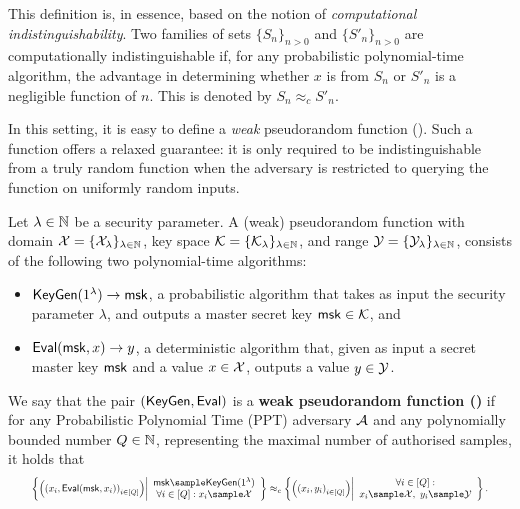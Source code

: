 This definition is, in essence, based on the notion of \emph{computational indistinguishability}. Two families of sets $\{S_n\}_{n > 0}$ and $\{S'_n\}_{n > 0}$ are computationally indistinguishable if, for any probabilistic polynomial-time algorithm, the advantage in determining whether $x$ is from $S_n$ or $S'_n$ is a negligible function of $n$. This is denoted by $S_n \approx_c S'_n$.

In this setting, it is easy to define a \emph{weak} pseudorandom function (\wPRF). Such a function offers a relaxed guarantee: it is only required to be indistinguishable from a truly random function when the adversary is restricted to querying the function on uniformly random inputs.
\begin{definition}
	Let $\lambda\in\mathbb{N}$ be a security parameter. A (weak) pseudorandom function with domain $\mathcal{X} = \{\mathcal{X}_{\lambda}\}_{\lambda \in \mathbb{N}}$, key space $\mathcal{K}= \{\mathcal{K}_{\lambda}\}_{\lambda \in \mathbb{N}}$, and range $\mathcal{Y} = \{\mathcal{Y}_{\lambda}\}_{\lambda \in \mathbb{N}}$, 
	consists of the following two polynomial-time algorithms: 
	\begin{itemize}
		\item[$\bullet$]$\mathsf{KeyGen}(1^{\lambda}) \rightarrow \mathsf{msk}$, a probabilistic algorithm that takes as input the security parameter $\lambda$, and outputs a master secret key $\mathsf{msk} \in \mathcal{K}$, and
		
		\item[$\bullet$]$\mathsf{Eval}(\mathsf{msk},x) \rightarrow y$, a deterministic algorithm that, given as input a  secret master key $\mathsf{msk}$ and a value $x \in \mathcal{X}$, outputs a value $y \in \mathcal{Y}$.
	\end{itemize}
	
	We say that the pair $(\mathsf{KeyGen},\mathsf{Eval})$ is a \textbf{weak pseudorandom function (\wPRF)} if for any Probabilistic Polynomial Time (PPT) adversary $\mathcal{A}$ and any polynomially bounded number $Q \in \mathbb{N}$, representing the maximal number of authorised samples, it holds that 
		\begin{multline*}
		\resizebox{.95\hsize}{!}{$\left\{ \left( \left(x_i,\Eval(\msk,x_i)\right)_{i \in [Q]} \right)\middle| \begin{array}{c} \msk \sample \KeyGen(1^{\lambda})\\ \forall i \in [Q]: x_i \sample \setX \end{array}\right\} \approx_c \left\{ \left(\left(x_i,y_i \right)_{i \in [Q]} \right) \middle| \begin{array}{c}
		\forall i \in [Q]: \\
		x_i \sample \setX , \ y_i \sample \setY
		\end{array} \right\}.$}
		\end{multline*}
\end{definition}

